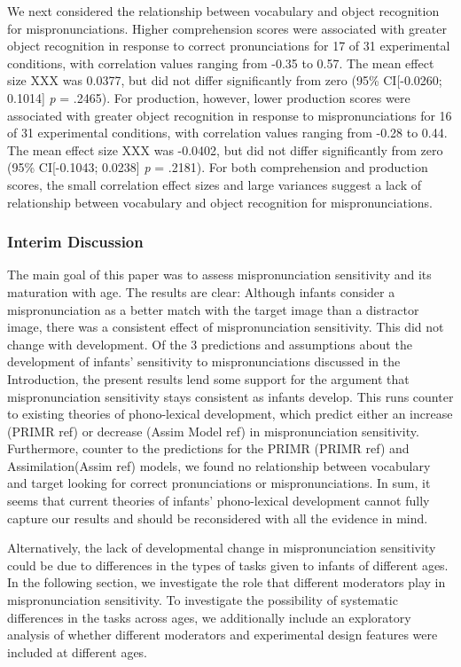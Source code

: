 \documentclass[man]{apa6}
\theoremstyle{definition}
\theoremstyle{definition}
\theoremstyle{definition}
\theoremstyle{remark}
\begin{document}
We next considered the relationship between vocabulary and object
recognition for mispronunciations. Higher comprehension scores were
associated with greater object recognition in response to correct
pronunciations for 17 of 31 experimental conditions, with correlation
values ranging from -0.35 to 0.57. The mean effect size XXX was 0.0377,
but did not differ significantly from zero (95\% CI{[}-0.0260; 0.1014{]}
\emph{p} = .2465). For production, however, lower production scores were
associated with greater object recognition in response to
mispronunciations for 16 of 31 experimental conditions, with correlation
values ranging from -0.28 to 0.44. The mean effect size XXX was -0.0402,
but did not differ significantly from zero (95\% CI{[}-0.1043; 0.0238{]}
\emph{p} = .2181). For both comprehension and production scores, the
small correlation effect sizes and large variances suggest a lack of
relationship between vocabulary and object recognition for
mispronunciations.

\subsubsection{Interim Discussion}\label{interim-discussion}

The main goal of this paper was to assess mispronunciation sensitivity
and its maturation with age. The results are clear: Although infants
consider a mispronunciation as a better match with the target image than
a distractor image, there was a consistent effect of mispronunciation
sensitivity. This did not change with development. Of the 3 predictions
and assumptions about the development of infants' sensitivity to
mispronunciations discussed in the Introduction, the present results
lend some support for the argument that mispronunciation sensitivity
stays consistent as infants develop. This runs counter to existing
theories of phono-lexical development, which predict either an increase
(PRIMR ref) or decrease (Assim Model ref) in mispronunciation
sensitivity. Furthermore, counter to the predictions for the PRIMR
(PRIMR ref) and Assimilation(Assim ref) models, we found no relationship
between vocabulary and target looking for correct pronunciations or
mispronunciations. In sum, it seems that current theories of infants'
phono-lexical development cannot fully capture our results and should be
reconsidered with all the evidence in mind.

Alternatively, the lack of developmental change in mispronunciation
sensitivity could be due to differences in the types of tasks given to
infants of different ages. In the following section, we investigate the
role that different moderators play in mispronunciation sensitivity. To
investigate the possibility of systematic differences in the tasks
across ages, we additionally include an exploratory analysis of whether
different moderators and experimental design features were included at
different ages.
\end{document}
